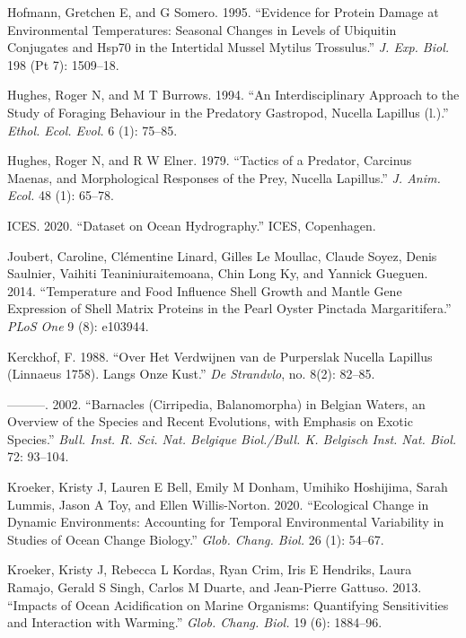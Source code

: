 \documentclass[smallextended]{svjour3}       %
\newlength{\cslhangindent}
\newenvironment{CSLReferences}[2] %
 {%
  \setlength{\parindent}{0pt}
  \ifodd #1 \everypar{\setlength{\hangindent}{\cslhangindent}}\ignorespaces\fi
  \ifnum #2 > 0
  \setlength{\parskip}{#2\baselineskip}
  \fi
 }%
 {}
\begin{document}
\begin{CSLReferences}{1}{0}
\leavevmode{}%
Hofmann, Gretchen E, and G Somero. 1995. {``Evidence for Protein Damage
at Environmental Temperatures: Seasonal Changes in Levels of Ubiquitin
Conjugates and Hsp70 in the Intertidal Mussel Mytilus Trossulus.''}
\emph{J. Exp. Biol.} 198 (Pt 7): 1509--18.

\leavevmode{}%
Hughes, Roger N, and M T Burrows. 1994. {``An Interdisciplinary Approach
to the Study of Foraging Behaviour in the Predatory Gastropod, Nucella
Lapillus (l.).''} \emph{Ethol. Ecol. Evol.} 6 (1): 75--85.

\leavevmode{}%
Hughes, Roger N, and R W Elner. 1979. {``Tactics of a Predator, Carcinus
Maenas, and Morphological Responses of the Prey, Nucella Lapillus.''}
\emph{J. Anim. Ecol.} 48 (1): 65--78.

\leavevmode{}%
ICES. 2020. {``Dataset on Ocean Hydrography.''} ICES, Copenhagen.

\leavevmode{}%
Joubert, Caroline, Clémentine Linard, Gilles Le Moullac, Claude Soyez,
Denis Saulnier, Vaihiti Teaniniuraitemoana, Chin Long Ky, and Yannick
Gueguen. 2014. {``Temperature and Food Influence Shell Growth and Mantle
Gene Expression of Shell Matrix Proteins in the Pearl Oyster Pinctada
Margaritifera.''} \emph{PLoS One} 9 (8): e103944.

\leavevmode{}%
Kerckhof, F. 1988. {``Over Het Verdwijnen van de Purperslak Nucella
Lapillus (Linnaeus 1758). Langs Onze Kust.''} \emph{De Strandvlo}, no.
8(2): 82--85.

\leavevmode{}%
---------. 2002. {``Barnacles (Cirripedia, Balanomorpha) in Belgian
Waters, an Overview of the Species and Recent Evolutions, with Emphasis
on Exotic Species.''} \emph{Bull. Inst. R. Sci. Nat. Belgique
Biol./Bull. K. Belgisch Inst. Nat. Biol.} 72: 93--104.

\leavevmode{}%
Kroeker, Kristy J, Lauren E Bell, Emily M Donham, Umihiko Hoshijima,
Sarah Lummis, Jason A Toy, and Ellen Willis-Norton. 2020. {``Ecological
Change in Dynamic Environments: Accounting for Temporal Environmental
Variability in Studies of Ocean Change Biology.''} \emph{Glob. Chang.
Biol.} 26 (1): 54--67.

\leavevmode{}%
Kroeker, Kristy J, Rebecca L Kordas, Ryan Crim, Iris E Hendriks, Laura
Ramajo, Gerald S Singh, Carlos M Duarte, and Jean-Pierre Gattuso. 2013.
{``Impacts of Ocean Acidification on Marine Organisms: Quantifying
Sensitivities and Interaction with Warming.''} \emph{Glob. Chang. Biol.}
19 (6): 1884--96.


\end{CSLReferences}
\end{document}
